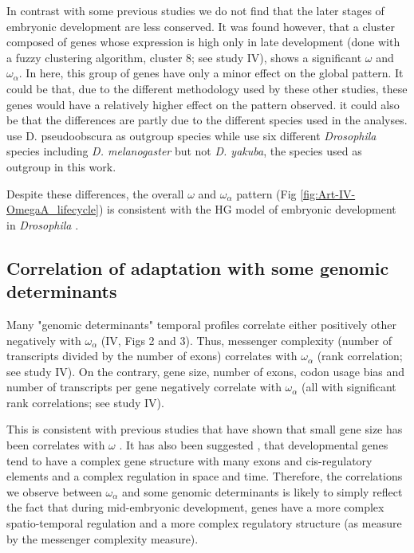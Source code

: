 In contrast with some previous studies \citep{Davis2005,Kalinka2010} we do not find that the later stages of embryonic development are less conserved. 
It was found however, that a cluster composed of genes whose expression is high only in late development (done with a fuzzy clustering algorithm, cluster 8; see study IV), shows a significant $\omega$ and $\omega_{\alpha}$. In here, this group of genes have only a minor effect on the global pattern.
It could be that, due to the different methodology used by these other studies, these genes would have a relatively higher effect on the pattern observed. it could also be that the differences are partly due to the different species used in the analyses.\citet{Davis2005} use D. pseudoobscura as outgroup species while \citet{Kalinka2010} use six different \textit{Drosophila} species including \textit{D. melanogaster} but not \textit{D. yakuba}, the species used as outgroup in this work.

Despite these differences, the overall $\omega$ and $\omega_{\alpha}$ pattern (Fig \ref{fig:Art-IV-OmegaA_lifecycle}) is consistent with the HG model of embryonic development in \textit{Drosophila} \citep{Kalinka2010}.


\subsection{Correlation of adaptation with some genomic determinants}
Many "genomic determinants" temporal profiles correlate either positively other negatively with $\omega_{\alpha}$ (IV, Figs 2 and 3). 
%
Thus, messenger complexity (number of transcripts divided by the number of exons) correlates with $\omega_{\alpha}$ (rank correlation; see study IV). On the contrary, gene size, number of exons, codon usage bias and number of transcripts per gene negatively correlate with $\omega_{\alpha}$ (all with significant rank correlations; see study IV). 

This is consistent with previous studies that have shown that small gene size has been correlates with $\omega$ \citep{Duret1999,Comeron2012}.
It has also been suggested \citep{Gellon1998}, that developmental genes tend to have a complex gene structure with many exons and cis-regulatory elements and a complex regulation in space and time. Therefore, the correlations we observe between $\omega_{\alpha}$ and some genomic determinants is likely to simply reflect the fact that during mid-embryonic development, genes have a more complex spatio-temporal regulation and a more complex regulatory structure (as measure by the messenger complexity measure).

